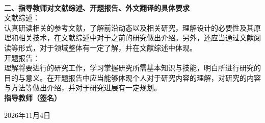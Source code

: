 \pagestyle{Require}
\stutitle \\
{\bfseries 二、指导教师对文献综述、开题报告、外文翻译的具体要求}\\
文献综述：\\
认真研读相关的参考文献，了解前沿动态以及相关研究，理解设计的必要性及其原理和相关技术，在文献综述中对于之前的研究做出介绍。另外，还应当通过文献阅读等形式，对于领域整体有一定了解，并在文献综述中体现。\\
开题报告：\\
理解将要进行的研究工作，学习掌握研究所需基本知识与技能，明白所进行研究的目的与意义。在开题报告中应当能够体现个人对于研究内容的理解，对研究的内容与方法等做出介绍，并对于研究进展有一定规划。\\

\vfill
{\hfill {\bfseries 指导教师（签名）\underline{\makebox[3cm]{}}}}\par
\hfill {  2026年11月4日}
